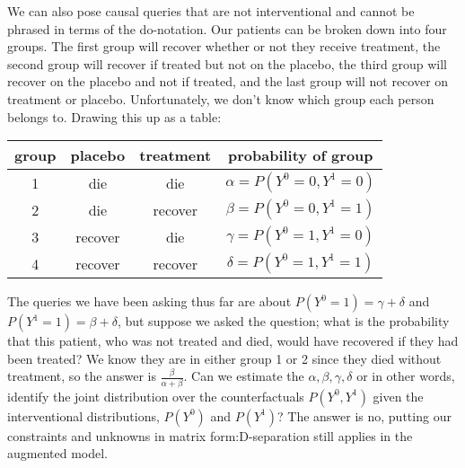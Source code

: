 \documentclass[11pt,a4paper]{article}
\begin{document}
We can also pose causal queries that are not interventional and cannot be phrased in terms of the do-notation. Our patients can be broken down into four groups. The first group will recover whether or not they receive treatment, the second group will recover if treated but not on the placebo, the third group will recover on the placebo and not if treated, and the last group will not recover on treatment or placebo. Unfortunately, we don't know which group each person belongs to. Drawing this up as a table:

\begin{tabular}{c|c|c|c}
group & placebo & treatment & probability of group\\
\hline
1 & die & die & $\alpha=P(Y^{0}=0,Y^{1}=0)$\\
2 & die & recover & $\beta=P(Y^{0}=0,Y^{1}=1)$\\
3 & recover & die & $\gamma=P(Y^{0}=1,Y^{1}=0)$\\
4 & recover & recover & $\delta=P(Y^{0}=1,Y^{1}=1)$\\
\end{tabular}

The queries we have been asking thus far are about $P(Y^{0}=1) = \gamma + \delta$ and $P(Y^{1}=1) = \beta + \delta$, but suppose we asked the question; what is the probability that this patient, who was not treated and died, would have recovered if they had been treated? We know they are in either group 1 or 2 since they died without treatment, so the answer is $\frac{\beta}{\alpha+\beta}$. Can we estimate the $\alpha, \beta, \gamma, \delta$ or in other words, identify the joint distribution over the counterfactuals $P(Y^{0},Y^{1})$ given the interventional distributions, $P(Y^{0})$ and $P(Y^{1})$? The answer is no, putting our constraints and unknowns in matrix form:D-separation still applies in the augmented model.
\end{document}
